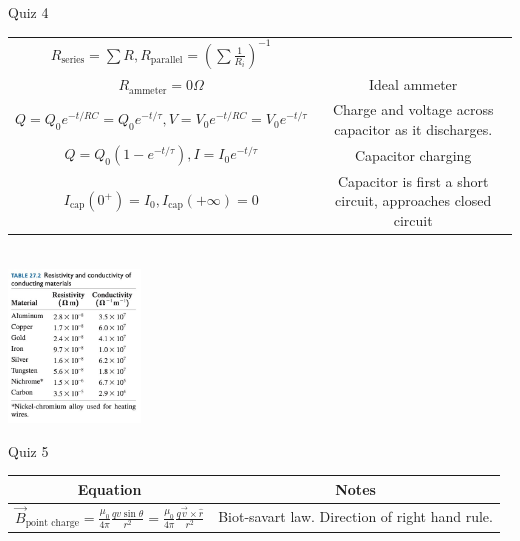 \documentclass{article}
\begin{document}
\begin{center}
\begin{section}{Quiz 4}
\begin{tabular}{|c|c|}
		 $R_\text{series} = \sum R, R_\text{parallel} = \left( \sum \frac{1}{R_i} \right)^{-1}$ &                                                                     \\

		 $R_\text{ammeter} = 0 \Omega $                                                         & Ideal ammeter                                                       \\

		 $Q = Q_0 e^{-t/RC} = Q_0 e^{-t/\tau}, V = V_0 e^{-t/RC} = V_0 e^{-t/\tau}$             & Charge and voltage across capacitor as it discharges.               \\

		 $Q = Q_0 (1 - e^{-t / \tau}), I = I_0 e^{-t / \tau}$                                   & Capacitor charging                                                  \\

		 $I_\text{cap}(0^+) = I_0, I_\text{cap}(+\infty) = 0$                                   & Capacitor is first a short circuit, approaches closed circuit       \\

		 \hline
	 \end{tabular}
	 \\
	 \includegraphics[width=100pt]{final_cheet_sheet_resources/ixfgtziofqygfpdtukouoiqdzfbfaoed.jpg}
	\end{section}

	\begin{section}{Quiz 5}
	 \begin{tabular}{|c|c|}
		 \hline
		 Equation                                                                 & Notes                                                              \\
		 \hline

		 $\vec B_\text{point charge} = \frac{\mu_0}{4 \pi} \frac{qv \sin \theta}{r^2}
		 = \frac{\mu_0}{4 \pi} \frac{q \vec v \times \hat r}{r^2}$                & Biot-savart law. Direction of right hand rule.                     \\


\end{tabular}
\end{section}
\end{center}
\end{document}
